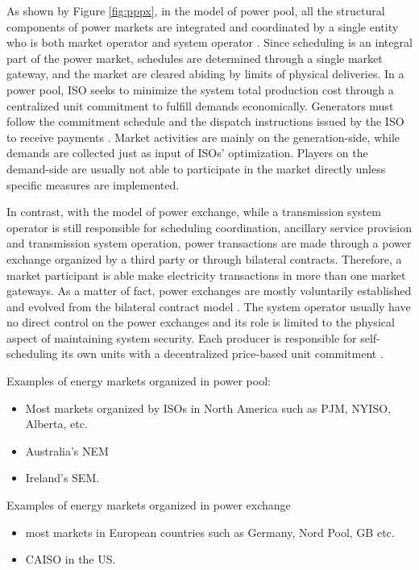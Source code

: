 As shown by Figure \ref{fig:pppx}, in the model of power pool, all the structural components of power markets are integrated and coordinated by a single entity who is both market operator and system operator  \cite{Srivastava2011,Barroso2005}. Since scheduling is an integral part of the power market, schedules are determined through a single market gateway, and the market are cleared abiding by limits of physical deliveries.  
In a power pool, ISO seeks to minimize the system total production cost through a centralized unit commitment to fulfill demands economically. Generators must follow the commitment schedule and the dispatch instructions issued by the ISO to receive payments \cite{Kardakos2013}. Market activities are mainly on the generation-side, while demands are collected just as input of ISOs' optimization. Players on the demand-side are usually not able to participate in the market directly unless specific measures are implemented.

In contrast, with the model of power exchange, while a transmission system operator is still responsible for scheduling coordination, ancillary service provision and transmission system operation, power transactions are made through a power exchange organized by a third party or through bilateral contracts. Therefore, a market participant is able make electricity transactions in more than one market gateways. As a matter of fact, power exchanges are mostly voluntarily established and evolved from the bilateral contract model \cite{Barroso2005}. The system operator usually have no direct control on the power exchanges and its role is limited to the physical aspect of maintaining system security. Each producer is responsible for self-scheduling its own units with a decentralized price-based unit commitment \cite{Kardakos2013}.


Examples of energy markets organized in power pool:
	\begin{itemize}
		\item Most markets organized by ISOs in North America such as PJM, NYISO, Alberta, etc.
		\item Australia's NEM
		\item Ireland's SEM.
	\end{itemize}

Examples of energy markets organized in power exchange
	\begin{itemize}
		\item most markets in European countries such as Germany, Nord Pool, GB etc.
		\item CAISO in the US.
	\end{itemize}

